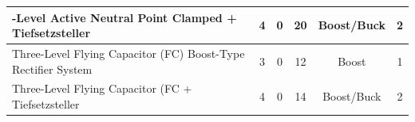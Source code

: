 \begin{table}
\begin{tabular}{|>{\centering\arraybackslash}p{3cm}|c|c|c|c|c|}
	\hline
	3-Level Active Neutral Point Clamped + Tiefsetzsteller & \cellcolor{yellow!25}4 &\cellcolor{green!25} 0 & \cellcolor{red!25}20 & \cellcolor{green!25}Boost/Buck & \cellcolor{red!25}2 \\
	\hline
	Three-Level Flying Capacitor (FC) Boost-Type Rectifier System & \cellcolor{yellow!25}3 & \cellcolor{green!25}0 & \cellcolor{yellow!25}12 & \cellcolor{red!25}Boost & \cellcolor{green!25}1 \\
	\hline
	Three-Level Flying Capacitor (FC + Tiefsetzsteller & \cellcolor{yellow!25}4 &\cellcolor{green!25}0 & \cellcolor{yellow!25}14 &\cellcolor{green!25} Boost/Buck &\cellcolor{red!25} 2 \\
	\hline
\end{tabular}
\end{table}
